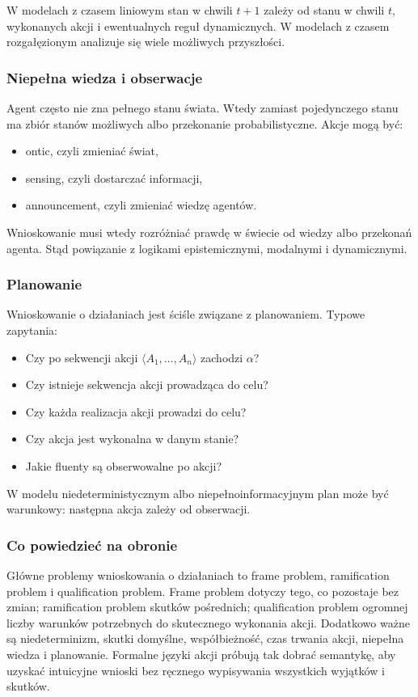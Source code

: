 W modelach z czasem liniowym stan w chwili $t+1$ zależy od stanu w chwili $t$, wykonanych akcji i ewentualnych reguł dynamicznych. W modelach z czasem rozgałęzionym analizuje się wiele możliwych przyszłości.

\subsubsection{Niepełna wiedza i obserwacje}

Agent często nie zna pełnego stanu świata. Wtedy zamiast pojedynczego stanu ma zbiór stanów możliwych albo przekonanie probabilistyczne. Akcje mogą być:
\begin{itemize}
  \item ontic, czyli zmieniać świat,
  \item sensing, czyli dostarczać informacji,
  \item announcement, czyli zmieniać wiedzę agentów.
\end{itemize}

Wnioskowanie musi wtedy rozróżniać prawdę w świecie od wiedzy albo przekonań agenta. Stąd powiązanie z logikami epistemicznymi, modalnymi i dynamicznymi.

\subsubsection{Planowanie}

Wnioskowanie o działaniach jest ściśle związane z planowaniem. Typowe zapytania:
\begin{itemize}
  \item Czy po sekwencji akcji $\langle A_1,\dots,A_n\rangle$ zachodzi $\alpha$?
  \item Czy istnieje sekwencja akcji prowadząca do celu?
  \item Czy każda realizacja akcji prowadzi do celu?
  \item Czy akcja jest wykonalna w danym stanie?
  \item Jakie fluenty są obserwowalne po akcji?
\end{itemize}

W modelu niedeterministycznym albo niepełnoinformacyjnym plan może być warunkowy: następna akcja zależy od obserwacji.

\subsubsection{Co powiedzieć na obronie}

Główne problemy wnioskowania o działaniach to frame problem, ramification problem i qualification problem. Frame problem dotyczy tego, co pozostaje bez zmian; ramification problem skutków pośrednich; qualification problem ogromnej liczby warunków potrzebnych do skutecznego wykonania akcji. Dodatkowo ważne są niedeterminizm, skutki domyślne, współbieżność, czas trwania akcji, niepełna wiedza i planowanie. Formalne języki akcji próbują tak dobrać semantykę, aby uzyskać intuicyjne wnioski bez ręcznego wypisywania wszystkich wyjątków i skutków.
